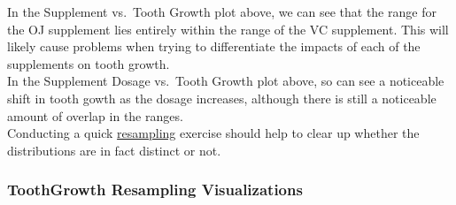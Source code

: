 \documentclass[]{article}
\begin{document}
In the Supplement vs.~Tooth Growth plot above, we can see that the range
for the OJ supplement lies entirely within the range of the VC
supplement. This will likely cause problems when trying to differentiate
the impacts of each of the supplements on tooth growth.\\
In the Supplement Dosage vs.~Tooth Growth plot above, so can see a
noticeable shift in tooth gowth as the dosage increases, although there
is still a noticeable amount of overlap in the ranges.\\
Conducting a quick
\href{https://en.wikipedia.org/wiki/Resampling_(statistics)}{resampling}
exercise should help to clear up whether the distributions are in fact
distinct or not.

\subsubsection{ToothGrowth Resampling
Visualizations}\label{toothgrowth-resampling-visualizations}
\end{document}
